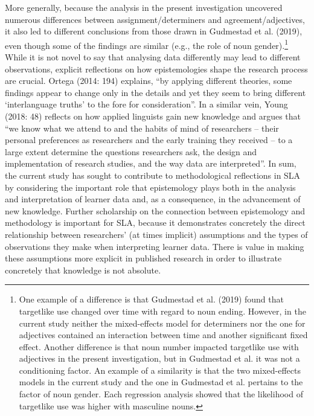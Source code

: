 \documentclass[12pt]{article}
\newenvironment{styleNoSpacing}{\setlength\leftskip{0cm}\setlength\rightskip{0cm plus 1fil}\setlength\parindent{0cm}\setlength\parfillskip{0pt plus 1fil}\setlength\parskip{0cm plus 1pt}\writerlistparindent\writerlistleftskip\leavevmode\normalfont\normalsize\fontsize{11pt}{13.2pt}\selectfont\writerlistlabel\ignorespaces}{\unskip\vspace{0cm plus 1pt}\par}
\newcommand\writerlistleftskip{}
\newcommand\writerlistparindent{}
\newcommand\writerlistlabel{}
\begin{document}
\begin{styleNoSpacing}
More generally, because the analysis in the present investigation uncovered numerous differences between assignment/determiners and agreement/adjectives, it also led to different conclusions from those drawn in Gudmestad et al. (2019), even though some of the findings are similar (e.g., the role of noun gender).\footnote{\textrm{ One example of a difference is that Gudmestad et al. (2019) found that targetlike use changed over time with regard to noun ending. However, in the current study neither the mixed-effects model for determiners nor the one for adjectives contained an interaction between time and another significant fixed effect. Another difference is that noun number impacted targetlike use with adjectives in the present investigation, but in Gudmestad et al. it was not a conditioning factor. An example of a similarity is that the two mixed-effects models in the current study and the one in Gudmestad et al. pertains to the factor of noun gender. Each regression analysis showed that the likelihood of targetlike use was higher with masculine nouns.}} While it is not novel to say that analysing data differently may lead to different observations, explicit reflections on how epistemologies shape the research process are crucial. Ortega (2014: 194) explains, “by applying different theories, some findings appear to change only in the details and yet they seem to bring different ‘interlanguage truths’ to the fore for consideration”. In a similar vein, Young (2018: 48) reflects on how applied linguists gain new knowledge and argues that “we know what we attend to and the habits of mind of researchers – their personal preferences as researchers and the early training they received – to a large extent determine the questions researchers ask, the design and implementation of research studies, and the way data are interpreted”. In sum, the current study has sought to contribute to methodological reflections in SLA by considering the important role that epistemology plays both in the analysis and interpretation of learner data and, as a consequence, in the advancement of new knowledge. Further scholarship on the connection between epistemology and methodology is important for SLA, because it demonstrates concretely the direct relationship between researchers’ (at times implicit) assumptions and the types of observations they make when interpreting learner data. There is value in making these assumptions more explicit in published research in order to illustrate concretely that knowledge is not absolute.
\end{styleNoSpacing}
\end{document}

